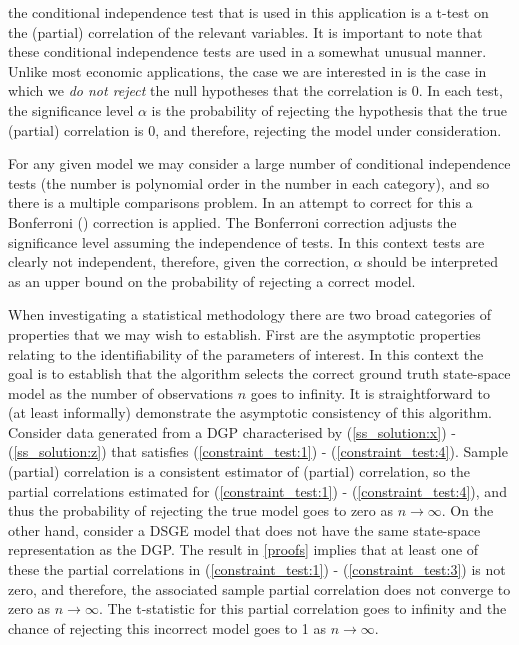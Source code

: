\documentclass{article}
\begin{document}
the conditional independence test that is used in this application is a t-test on the (partial) correlation of the relevant variables. It is important to note that these conditional independence tests are used in a somewhat unusual manner. Unlike most economic applications, the case we are interested in is the case in which we \textit{do not reject} the null hypotheses that the correlation is 0. In each test, the significance level $\alpha$ is the probability of rejecting the hypothesis that the true (partial) correlation is 0, and therefore, rejecting the model under consideration. 

For any given model we may consider a large number of conditional independence tests (the number is polynomial order in the number in each category), and so there is a multiple comparisons problem. In an attempt to correct for this a Bonferroni (\citeyear{bonferroni1936teoria}) correction is applied. The Bonferroni correction adjusts the significance level assuming the independence of tests. In this context tests are clearly not independent, therefore, given the correction, $\alpha$ should be interpreted as an upper bound on the probability of rejecting a correct model.

When investigating a statistical methodology there are two broad categories of properties that we may wish to establish. First are the asymptotic properties relating to the identifiability of the parameters of interest. In this context the goal is to establish that the algorithm selects the correct ground truth state-space model as the number of observations $n$ goes to infinity. It is straightforward to (at least informally) demonstrate the asymptotic consistency of this algorithm. Consider data generated from a DGP characterised by (\ref{ss_solution:x}) - (\ref{ss_solution:z}) that satisfies (\ref{constraint_test:1}) - (\ref{constraint_test:4}). Sample (partial) correlation is a consistent estimator of (partial) correlation, so the partial correlations estimated for (\ref{constraint_test:1}) - (\ref{constraint_test:4}), and thus the probability of rejecting the true model goes to zero as $n \rightarrow \infty$. On the other hand, consider a DSGE model that does not have the same state-space representation as the DGP. The result in \ref{proofs} implies that at least one of these the partial correlations in (\ref{constraint_test:1}) - (\ref{constraint_test:3}) is not zero, and therefore, the associated sample partial correlation does not converge to zero as $n \rightarrow \infty$. The t-statistic for this partial correlation goes to infinity and the chance of rejecting this incorrect model goes to 1 as $n \rightarrow \infty$.
\end{document}
